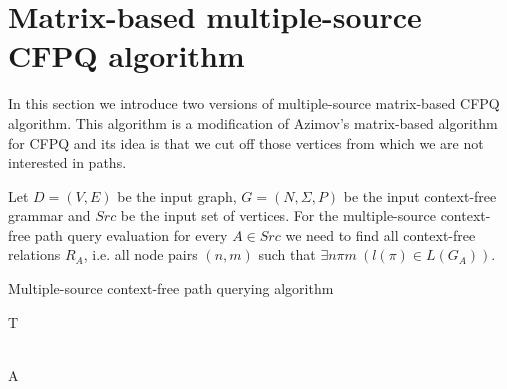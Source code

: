 \section{Matrix-based multiple-source CFPQ algorithm}
\label{sec:multiple-source-algo}
 In this section we introduce two versions of multiple-source matrix-based CFPQ algorithm. This algorithm is a modification of Azimov's matrix-based algorithm for CFPQ and its idea is that we cut off those vertices from which we are not interested in paths.
 
 Let \mbox{$D = (V, E)$} be the input graph, \mbox{$G = (N, \Sigma, P)$} be the input context-free grammar and $Src$ be the input set of vertices. For the multiple-source context-free path query evaluation for every $A \in Src$ we need to find all context-free relations $R_A$, i.e. all node pairs \mbox{$(n,m)$} such that \mbox{$\exists n \pi m~(l(\pi) \in L(G_A))$}.
\begin{algorithm}
\begin{algorithmic}[1]
\caption{Multiple-source context-free path querying algorithm}
\label{alg:algo1}
    

     
    \EndFor

     
        \EndFor
    \EndFor

     
        \EndFor
    \EndWhile
    \State \Return T
\EndFunction

\\

    \EndFor
    \State \Return A
\EndFunction
\end{algorithmic}
\end{algorithm}
